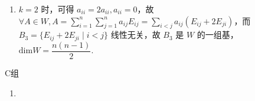 \begin{enumerate}
\begin{enumerate}
              \item $k=2$ 时，可得 $a_{ii}=2a_{ii},a_{ii}=0$，故 $\forall A\in W,A = \displaystyle\sum_{i=1}^n\sum_{j=1}^na_{ij}E_{ij}=\sum_{i<j}a_{ij}(E_{ij}+2E_{ji})$，而 $B_3=\{E_{ij}+2E_{ji} \mid i<j\}$ 线性无关，故 $B_3$ 是 $W$ 的一组基，$\mathrm{dim}W=\dfrac{n(n-1)}{2}$.
          \end{enumerate}
\end{enumerate}

\centerline{\heiti C组}
\begin{enumerate}
    \item
\end{enumerate}

\clearpage
